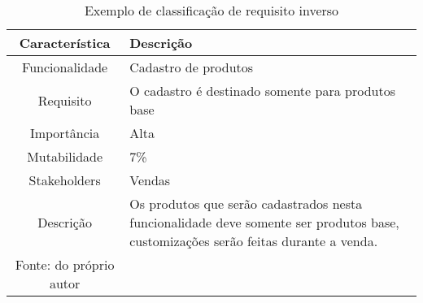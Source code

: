       \begin{table}[h!]
        \centering
        \label{Tabela:7}
        \caption{Exemplo de classificação de requisito inverso}
        \begin{tabular}{c p{9cm}}
          \hline
          \textbf{Característica} &
          \textbf{Descrição} \\
          \hline
          Funcionalidade &
          Cadastro de produtos \\
          Requisito &
          O cadastro é destinado somente para produtos base \\
          Importância &
          Alta \\
          Mutabilidade &
          7\% \\
          Stakeholders &
          Vendas \\
          Descrição &
          Os produtos que serão cadastrados nesta funcionalidade deve somente ser
          produtos base, customizações serão feitas durante a venda. \\ \hline
          \newline
          \small{Fonte: do próprio autor}
        \end{tabular}
      \end{table}

